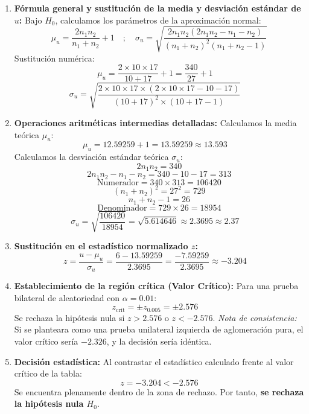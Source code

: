 \documentclass[11pt,a4paper]{article}
\begin{document}
\begin{enumerate}
    \item \textbf{Fórmula general y sustitución de la media y desviación estándar de $u$:}
    Bajo $H_0$, calculamos los parámetros de la aproximación normal:
    \[ \mu_u = \frac{2 n_1 n_2}{n_1 + n_2} + 1 \quad ; \quad \sigma_u = \sqrt{\frac{2 n_1 n_2 (2 n_1 n_2 - n_1 - n_2)}{(n_1 + n_2)^2 (n_1 + n_2 - 1)}} \]
    Sustitución numérica:
    \[ \mu_u = \frac{2 \times 10 \times 17}{10 + 17} + 1 = \frac{340}{27} + 1 \quad \]
    \[ \sigma_u = \sqrt{\frac{2 \times 10 \times 17 \times (2 \times 10 \times 17 - 10 - 17)}{(10 + 17)^2 \times (10 + 17 - 1)}} \quad \]

    \item \textbf{Operaciones aritméticas intermedias detalladas:}
    Calculamos la media teórica $\mu_u$:
    \[ \mu_u = 12.59259 + 1 = 13.59259 \approx 13.593 \quad \]
    Calculamos la desviación estándar teórica $\sigma_u$:
    \[ 2 n_1 n_2 = 340 \]
    \[ 2 n_1 n_2 - n_1 - n_2 = 340 - 10 - 17 = 313 \]
    \[ \text{Numerador} = 340 \times 313 = 106420 \]
    \[ (n_1 + n_2)^2 = 27^2 = 729 \]
    \[ n_1 + n_2 - 1 = 26 \]
    \[ \text{Denominador} = 729 \times 26 = 18954 \]
    \[ \sigma_u = \sqrt{\frac{106420}{18954}} = \sqrt{5.614646} \approx 2.3695 \approx 2.37 \quad \]

    \item \textbf{Sustitución en el estadístico normalizado $z$:}
    \[ z = \frac{u - \mu_u}{\sigma_u} = \frac{6 - 13.59259}{2.3695} = \frac{-7.59259}{2.3695} \approx -3.204 \quad \]

    \item \textbf{Establecimiento de la región crítica (Valor Crítico):}
    Para una prueba bilateral de aleatoriedad con $\alpha = 0.01$:
    \[ z_{\text{crit}} = \pm z_{0.005} = \pm 2.576 \quad \]
    Se rechaza la hipótesis nula si $z > 2.576$ o $z < -2.576$.
    \textit{Nota de consistencia:} Si se planteara como una prueba unilateral izquierda de aglomeración pura, el valor crítico sería $-2.326$, y la decisión sería idéntica.

    \item \textbf{Decisión estadística:}
    Al contrastar el estadístico calculado frente al valor crítico de la tabla:
    \[ z = -3.204 < -2.576 \]
    Se encuentra plenamente dentro de la zona de rechazo. Por tanto, \textbf{se rechaza la hipótesis nula $H_0$}.

    \begin{figure}[htbp]
    \centering
\end{figure}
\end{enumerate}
\end{document}
